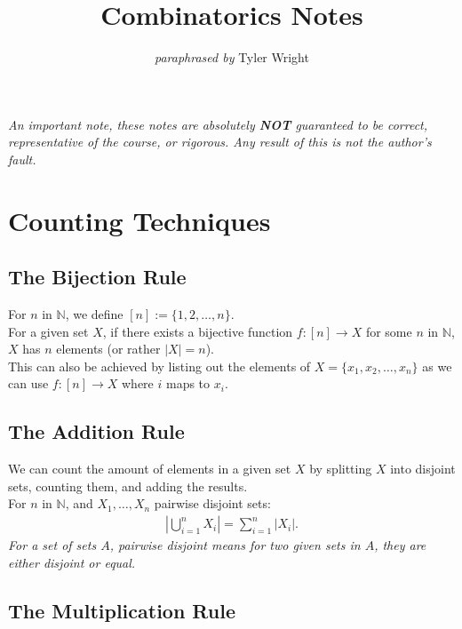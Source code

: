 \documentclass[a4paper, 12pt, twoside]{article}
\begin{document}
\title{Combinatorics Notes}
\date{}
\author{\textit{paraphrased by} Tyler Wright}
\maketitle

\vfill

\textit{An important note, these notes are absolutely \textbf{NOT}
  guaranteed to be correct, representative of the course, or rigorous.
  Any result of this is not the author's fault.}

\newpage

\section{Counting Techniques}

\subsection{The Bijection Rule}

For $n$ in $\mathbb{N}$, we define $[n] := \{1, 2, \ldots, n\}$.
\\[\baselineskip]
For a given set $X$, if there exists a bijective function 
$f : [n] \to X$ for some $n$ in $\mathbb{N}$, $X$ has $n$ elements
(or rather $|X| = n$).
\\[\baselineskip]
This can also be achieved by listing out the elements of 
$X = \{x_1, x_2, \ldots, x_n\}$ as we can use $f : [n] \to X$
where $i$ maps to $x_i$.

\subsection{The Addition Rule}

We can count the amount of elements in a given set $X$ by
splitting $X$ into disjoint sets, counting them, and adding the
results.
\\[\baselineskip]
For $n$ in $\mathbb{N}$, and $X_1, \ldots, X_n$ pairwise disjoint
sets: \begin{gather*}
  \left|\bigcup_{i = 1}^n X_i\right| = \sum_{i = 1}^n |X_i|.
\end{gather*} \textit{For a set of sets $A$, pairwise disjoint means 
for two given sets in $A$, they are either disjoint or equal.}

\subsection{The Multiplication Rule}
\end{document}
